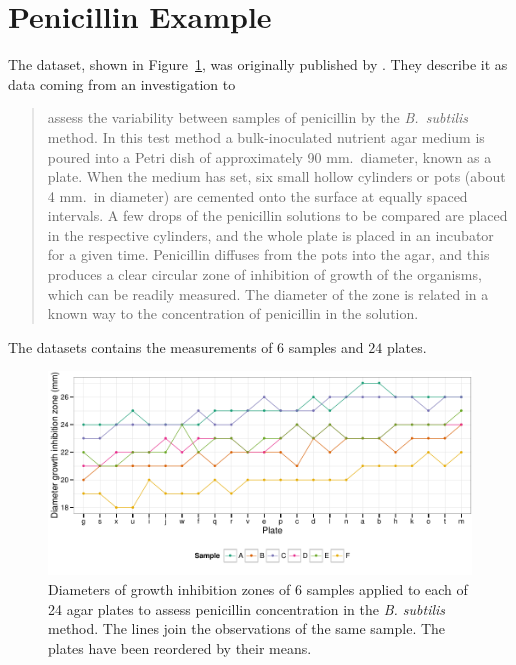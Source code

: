 \documentclass[11pt, a4paper]{article}
\theoremstyle{note}
\begin{document}




\section{Penicillin Example}
The dataset, shown in Figure~\ref{fig:penicillinRaw}, was originally
published by \citet{davies72penicillin}. They describe it as data coming
from an investigation to
\begin{quote}
  assess the variability between samples of penicillin by the
  \emph{B.~subtilis} method.  In this test method a bulk-inoculated
  nutrient agar medium is poured into a Petri dish of approximately 90
  mm.\ diameter, known as a plate.  When the medium has set, six small
  hollow cylinders or pots (about 4 mm.\ in diameter) are cemented onto
  the surface at equally spaced intervals.  A few drops of the
  penicillin solutions to be compared are placed in the respective
  cylinders, and the whole plate is placed in an incubator for a given
  time.  Penicillin diffuses from the pots into the agar, and this
  produces a clear circular zone of inhibition of growth of the
  organisms, which can be readily measured.  The diameter of the zone
  is related in a known way to the concentration of penicillin in the
  solution.
\end{quote}
The datasets contains the measurements of $6$ samples and $24$ plates.

\label{sec:penicillin}

\begin{figure}[htbp]
  \centering
  \includegraphics{figs/fig-ex-penicillin-raw}
  \caption{Diameters of growth inhibition zones of 6 samples applied to
    each of 24 agar plates to assess penicillin concentration in the
    \emph{B. subtilis} method. The lines join the observations of the same
    sample. The plates have been reordered by their means.}
  \label{fig:penicillinRaw}
\end{figure}
\end{document}
